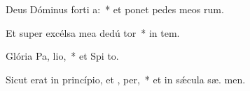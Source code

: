 \item Deus Dóminus forti a:~* et ponet pedes meos  rum.
\item Et super excélsa mea dedú  tor~* in  tem.
\item Glória Pa,  lio,~* et Spi to.
\item Sicut erat in princípio, et ,  per,~* et in sǽcula sæ. men.
